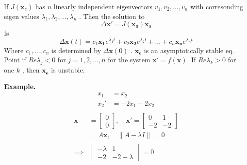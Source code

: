 \documentclass{article}
\theoremstyle{remark}
\begin{document}
If $J\left( \mathbf{x}_{e} \right)$ has $n$ linearly independent eigenvectors $v_{1}, v_{2}, \ldots , v_{n} $ with corresonding  eigen values $\lambda _{1}, \lambda _{2}, \ldots, \lambda _{n}$ . Then the solution to \[
\Delta \mathbf{x}' = J\left( \mathbf{x_{0}} \right)  \mathbf{x}_{0} 
\] 
Is \[
\Delta \mathbf{x}\left( t \right) = c_{1} \mathbf{x_{1}}e^{\lambda _{1}t} + c_{2} \mathbf{x_{2}} e^{\lambda _{2} t} + \ldots + c_{n} \mathbf{x_{n}} e^{\lambda _{n} t}
\] 
Where $ c_{1}, \ldots, c_{n} $ is determined by $ \Delta \mathbf{x} \left( 0 \right)$ . $\mathbf{x_{e}}$ is an asymptotically stable eq. Point  if $Re \lambda _{j} < 0 $ for $ j = 1,2 ,\ldots, n$ for the system $\mathbf{\mathbf{x}' } = f\left( \mathbf{x} \right) $. If $Re \lambda _{k} > 0$ for one $k$ , then $\mathbf{x_{e}}$ is unstable. 

\begin{tcolorbox}
  \textbf{Example.}  \[
    \begin{split}
      x_{1}  & = x_{2} \\
      x_{2} '  &= -2x_{1} -2x_{2}   \\
    \end{split} 
  \] 
  \[
    \begin{split}
  \mathbf{x}  & = \begin{bmatrix}  
  0 \\
  0
  \end{bmatrix}, \quad   
  \mathbf{x}'  
    = \begin{bmatrix} 
  0 &  1 \\
  -2  &  -2
  \end{bmatrix} 
  \\
  &= A\mathbf{x}, \quad  \|A - \lambda I\|_{}^{} = 0  \\
    \implies   &  \begin{vmatrix} 
    -\lambda   & 1 \\
    -2  &  -2-\lambda 
    \end{vmatrix} 
    = 0 \\
    \end{split} 
  \] 


\end{tcolorbox}
\end{document}
